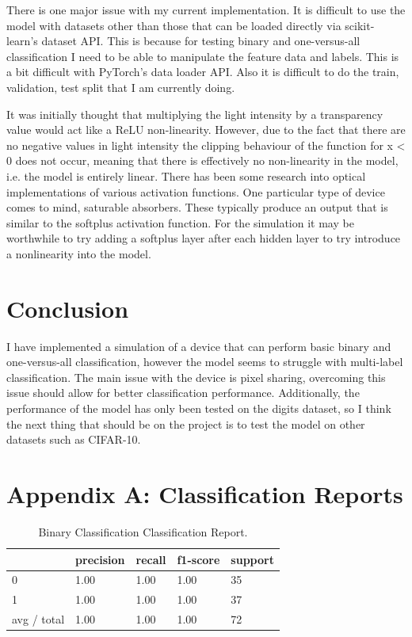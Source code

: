 \documentclass[]{article}
\begin{document}
There is one major issue with my current implementation. It is difficult to use the model with datasets other than those that can be loaded directly via scikit-learn’s dataset API. This is because for testing binary and one-versus-all classification I need to be able to manipulate the feature data and labels. This is a bit difficult with PyTorch’s data loader API. Also it is difficult to do the train, validation, test split that I am currently doing. 


It was initially thought that multiplying the light intensity by a transparency value would act like a ReLU non-linearity. However, due to the fact that there are no negative values in light intensity the clipping behaviour of the function for x < 0 does not occur, meaning that there is effectively no non-linearity in the model, i.e. the model is entirely linear. There has been some research into optical implementations of various activation functions. One particular type of device comes to mind, saturable absorbers. These typically produce an output that is similar to the softplus activation function. For the simulation it may be worthwhile to try adding a softplus layer after each hidden layer to try introduce a nonlinearity into the model.

\section{Conclusion}
I have implemented a simulation of a device that can perform basic binary and one-versus-all classification, however the model seems to struggle with multi-label classification. The main issue with the device is pixel sharing, overcoming this issue should allow for better classification performance. Additionally, the performance of the model has only been tested on the digits dataset, so I think the next thing that should be on the project is to test the model on other datasets such as CIFAR-10.

\newpage
\appendix
\section{Appendix A: Classification Reports}
\begin{table}[h]
	\begin{tabular}{l|llll}
		& precision & recall & f1-score & support \\ \hline
		0 & 1.00 & 1.00 & 1.00 & 35 \\
		1 & 1.00 & 1.00 & 1.00 & 37  \\
		avg / total & 1.00 & 1.00 & 1.00 & 72 
	\end{tabular}
	\caption{Binary Classification Classification Report.}
\end{table}
\end{document}
